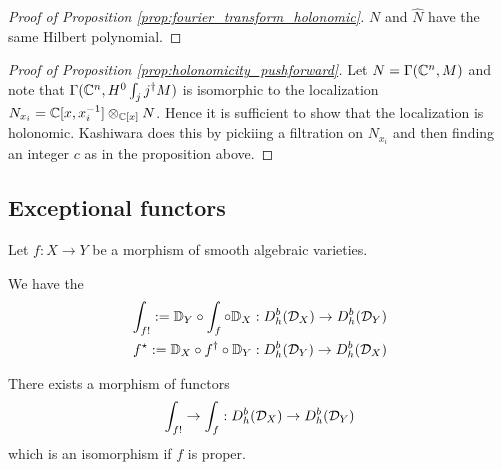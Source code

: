\begin{proof}
	[Proof of Proposition \ref{prop:fourier_transform_holonomic}]
	$N$ and $\hat N$ have the same Hilbert polynomial.
\end{proof}

\begin{proof}
	[Proof of Proposition \ref{prop:holonomicity_pushforward}]
	Let $N = \Gamma(\mathbb{C}^n,M)$ and note that $\Gamma(\mathbb{C}^n,H^0\int_j j^\dagger M)$ is
	isomorphic to the localization $N_{x_i} = \mathbb{C}[x,x_i^{-1}]\otimes_{\mathbb{C}[x]} N$.
	Hence it is sufficient to show that the localization is
	holonomic. Kashiwara does this by pickiing a filtration on $N_{x_i}$ and then
	finding an integer $c$ as in the proposition above.
\end{proof}

\subsection{Exceptional functors}
Let $f:X\to Y$ be a morphism of smooth algebraic varieties.
\begin{definition}
	We have the  \begin{align*}
		\int_{f!} := \mathbb{D}_Y\circ \int_f \circ \mathbb{D}_X : D^b_h({\mathcal{D}}_X) \to D^b_h({\mathcal{D}}_Y) \\
		f^\star := \mathbb{D}_X\circ f^\dagger \circ \mathbb{D}_Y : D^b_h({\mathcal{D}}_Y) \to D^b_h({\mathcal{D}}_X)
	\end{align*}
\end{definition}

\begin{theorem}
	There exists a morphism of functors \begin{align*}
		\int_{f!}\to \int_f: D^b_h({\mathcal{D}}_X) \to D^b_h({\mathcal{D}}_Y)
	\end{align*} which is an isomorphism if $f$ is proper. 
\end{theorem}

